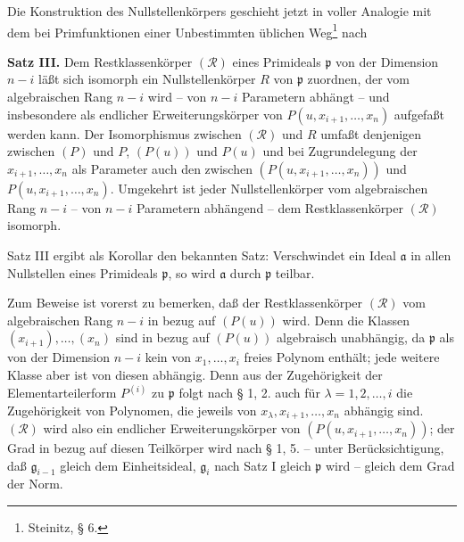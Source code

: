 \documentclass[11pt]{article}
\providecommand{\frakp}{\mathfrak p}
\providecommand{\fraka}{\mathfrak a}
\providecommand{\frakg}{\mathfrak g}
\begin{document}
Die Konstruktion des Nullstellenkörpers geschieht jetzt in voller Analogie mit dem bei Primfunktionen einer Unbestimmten üblichen Weg\footnote{Steinitz, § 6.} nach

\textbf{Satz III.} Dem Restklassenkörper $(\mathcal R)$ eines Primideals $\frakp$ von der Dimension $n-i$ läßt sich isomorph ein Nullstellenkörper $R$ von $\frakp$ zuordnen, der vom algebraischen Rang $n-i$ wird -- von $n-i$ Parametern abhängt -- und insbesondere als endlicher Erweiterungskörper von $P(u,x_{i+1},\ldots,x_n)$ aufgefaßt werden kann. Der Isomorphismus zwischen $(\mathcal R)$ und $R$ umfaßt denjenigen zwischen $(P)$ und $P$, $(P(u))$ und $P(u)$ und bei Zugrundelegung der $x_{i+1},\ldots,x_n$ als Parameter auch den zwischen $(P(u,x_{i+1},\ldots,x_n))$ und $P(u,x_{i+1},\ldots,x_n)$. Umgekehrt ist jeder Nullstellenkörper vom algebraischen Rang $n-i$ -- von $n-i$ Parametern abhängend -- dem Restklassenkörper $(\mathcal R)$ isomorph.

Satz III ergibt als Korollar den bekannten Satz: Verschwindet ein Ideal $\fraka$ in allen Nullstellen eines Primideals $\frakp$, so wird $\fraka$ durch $\frakp$ teilbar.

Zum Beweise ist vorerst zu bemerken, daß der Restklassenkörper $(\mathcal R)$ vom algebraischen Rang $n-i$ in bezug auf $(P(u))$ wird. Denn die Klassen $(x_{i+1}),\ldots,(x_n)$ sind in bezug auf $(P(u))$ algebraisch unabhängig, da $\frakp$ als von der Dimension $n-i$ kein von $x_1,\ldots,x_i$ freies Polynom enthält; jede weitere Klasse aber ist von diesen abhängig. Denn aus der Zugehörigkeit der Elementarteilerform $P^{(i)}$ zu $\frakp$ folgt nach § 1, 2. auch für $\lambda=1,2,\ldots,i$ die Zugehörigkeit von Polynomen, die jeweils von $x_\lambda,x_{i+1},\ldots,x_n$ abhängig sind. $(\mathcal R)$ wird also ein endlicher Erweiterungskörper von $(P(u,x_{i+1},\ldots,x_n))$; der Grad in bezug auf diesen Teilkörper wird nach § 1, 5. -- unter Berücksichtigung, daß $\frakg_{i-1}$ gleich dem Einheitsideal, $\frakg_i$ nach Satz I gleich $\frakp$ wird -- gleich dem Grad der Norm.
\end{document}
